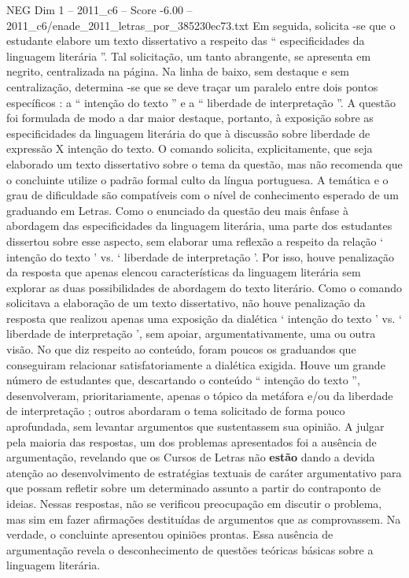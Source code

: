 \begin{textsample}{NEG Dim 1 – 2011\_c6 – Score -6.00 – 2011\_c6/enade\_2011\_letras\_por\_385230ec73.txt}
Em seguida, solicita -se que o estudante elabore um texto dissertativo a respeito das “ especificidades da linguagem literária ”.
Tal solicitação, um tanto abrangente, se apresenta em negrito, centralizada na página.
Na linha de baixo, sem destaque e sem centralização, determina -se que se deve traçar um paralelo entre dois pontos específicos : a “ intenção do texto ” e a “ liberdade de interpretação ”.
A questão foi formulada de modo a dar maior destaque, portanto, à exposição sobre as especificidades da linguagem literária do que à discussão sobre liberdade de expressão X intenção do texto.
O comando solicita, explicitamente, que seja elaborado um texto dissertativo sobre o tema da questão, mas não recomenda que o concluinte utilize o padrão formal culto da língua portuguesa.
A temática e o grau de dificuldade são compatíveis com o nível de conhecimento esperado de um graduando em Letras.
Como o enunciado da questão deu mais ênfase à abordagem das especificidades da linguagem literária, uma parte dos estudantes dissertou sobre esse aspecto, sem elaborar uma reflexão a respeito da relação ‘ intenção do texto ’ vs. ‘ liberdade de interpretação ’.
Por isso, houve penalização da resposta que apenas elencou características da linguagem literária sem explorar as duas possibilidades de abordagem do texto literário.
Como o comando solicitava a elaboração de um texto dissertativo, não houve penalização da resposta que realizou apenas uma exposição da dialética ‘ intenção do texto ’ vs. ‘ liberdade de interpretação ’, sem apoiar, argumentativamente, uma ou outra visão.
No que diz respeito ao conteúdo, foram poucos os graduandos que conseguiram relacionar satisfatoriamente a dialética exigida.
Houve um grande número de estudantes que, descartando o conteúdo “ intenção do texto ”, desenvolveram, prioritariamente, apenas o tópico da metáfora e/ou da liberdade de interpretação ; outros abordaram o tema solicitado de forma pouco aprofundada, sem levantar argumentos que sustentassem sua opinião.
A julgar pela maioria das respostas, um dos problemas apresentados foi a ausência de argumentação, revelando que os Cursos de Letras não \textbf{estão} dando a devida atenção ao desenvolvimento de estratégias textuais de caráter argumentativo para que possam refletir sobre um determinado assunto a partir do contraponto de ideias.
Nessas respostas, não se verificou preocupação em discutir o problema, mas sim em fazer afirmações destituídas de argumentos que as comprovassem.
Na verdade, o concluinte apresentou opiniões prontas.
Essa ausência de argumentação revela o desconhecimento de questões teóricas básicas sobre a linguagem literária.

\end{textsample}

